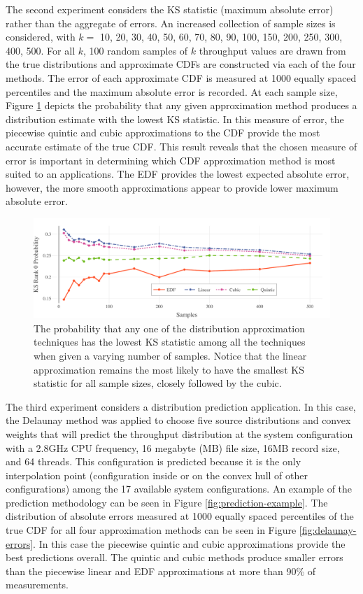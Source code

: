\documentclass[letterpaper, 10 pt, conference]{ieeeconf}  %
\begin{document}
The second experiment considers the KS statistic (maximum absolute error) rather than the aggregate of errors. An increased collection of sample sizes is considered, with $k =$ 10, 20, 30, 40, 50, 60, 70, 80, 90, 100, 150, 200, 250, 300, 400, 500. For all $k$, 100 random samples of $k$ throughput values are drawn from the true distributions and approximate CDFs are constructed via each of the four methods. The error of each approximate CDF is measured at 1000 equally spaced percentiles and the maximum absolute error is recorded. At each sample size, Figure \ref{fig:ks-rank-0} depicts the probability that any given approximation method produces a distribution estimate with the lowest KS statistic. In this measure of error, the piecewise quintic and cubic approximations to the CDF provide the most accurate estimate of the true CDF. This result reveals that the chosen measure of error is important in determining which CDF approximation method is most suited to an applications. The EDF provides the lowest expected absolute error, however, the more smooth approximations appear to provide lower maximum absolute error.

\begin{figure}
  \vspace{-.3cm}
  \includegraphics[width=1\textwidth]{KS-rank-0-probability.pdf}
  \caption{The probability that any one of the distribution approximation techniques has the lowest KS statistic among all the techniques when given a varying number of samples. Notice that the linear approximation remains the most likely to have the smallest KS statistic for all sample sizes, closely followed by the cubic.
  \vspace{-.5cm}}
  \label{fig:ks-rank-0}
\end{figure}


The third experiment considers a distribution prediction application. In this case, the Delaunay method was applied to choose five source distributions and convex weights that will predict the throughput distribution at the system configuration with a 2.8GHz CPU frequency, 16 megabyte (MB) file size, 16MB record size, and 64 threads. This configuration is predicted because it is the only interpolation point (configuration inside or on the convex hull of other configurations) among the 17 available system configurations. An example of the prediction methodology can be seen in Figure \ref{fig:prediction-example}. The distribution of absolute errors measured at 1000 equally spaced percentiles of the true CDF for all four approximation methods can be seen in Figure \ref{fig:delaunay-errors}. In this case the piecewise quintic and cubic approximations provide the best predictions overall. The quintic and cubic methods produce smaller errors than the piecewise linear and EDF approximations at more than 90\% of measurements.
\end{document}
